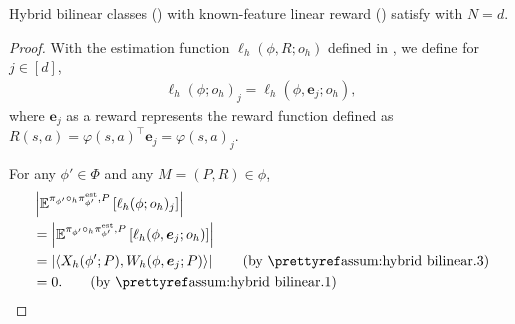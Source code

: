 \begin{lemma}
   Hybrid bilinear classes () with known-feature linear reward () satisfy  with $N=d$. 
\end{lemma}
\begin{proof}
   With the estimation function $\ell_h(\phi, R; o_h)$ defined in , we define for $j\in[d]$, 
   \begin{align*}
       \ell_h(\phi; o_h)_j = \ell_h(\phi, \bm{e}_j; o_h), 
   \end{align*}
   where $\bm{e}_j$ as a reward represents the reward function defined as $R(s,a)=\varphi(s,a)^\top \bm{e}_j = \varphi(s,a)_j$. 

   For any $\phi'\in\Phi$ and any $M=(P,R)\in\phi$, 
   \begin{align*}
       &\left|\E^{\pi_{\phi'} \circ_h \pi_{\phi'}^{\esttt}, P } \left[\ell_h (\phi; o_h)_j \right]\right| \\
       &= \left|\E^{\pi_{\phi'} \circ_h \pi_{\phi'}^{\esttt}, P } \left[\ell_h (\phi, \bm{e}_j; o_h) \right]\right| \\
       &= \left|\inner{X_h(\phi'; P), W_h(\phi, \bm{e}_j; P)}\right|   \tag{by \pref{assum:hybrid bilinear}.3} \\
       &= 0.  \tag{by \pref{assum:hybrid bilinear}.1}
   \end{align*}
\end{proof}




